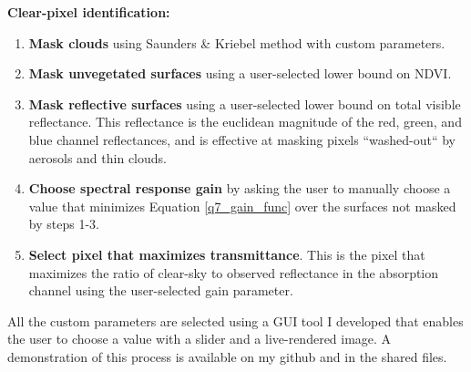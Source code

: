 \documentclass[12pt]{article}
\begin{document}
\noindent
\textbf{Clear-pixel identification:}
\begin{enumerate}
    \item{\textbf{Mask clouds} using Saunders \& Kriebel method with custom parameters.}
    \item{\textbf{Mask unvegetated surfaces} using a user-selected lower bound on NDVI.}
    \item{\textbf{Mask reflective surfaces} using a user-selected lower bound on total visible reflectance. This reflectance is the euclidean magnitude of the red, green, and blue channel reflectances, and is effective at masking pixels ``washed-out`` by aerosols and thin clouds.}
    \item{\textbf{Choose spectral response gain} by asking the user to manually choose a value that minimizes Equation \ref{q7_gain_func} over the surfaces not masked by steps 1-3.}
    \item{\textbf{Select pixel that maximizes transmittance}. This is the pixel that maximizes the ratio of clear-sky to observed reflectance in the absorption channel using the user-selected gain parameter.}
\end{enumerate}

All the custom parameters are selected using a GUI tool I developed that enables the user to choose a value with a slider and a live-rendered image. A demonstration of this process is available on my github and in the shared files.

\clearpage
\end{document}
